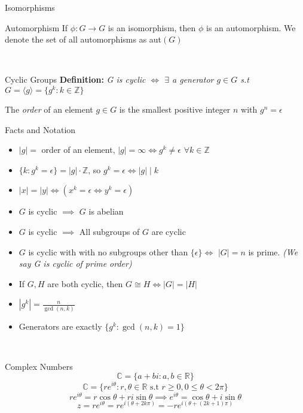 \documentclass{article}
\begin{document}
\begin{multicols*}{3}
\begin{blackbox}{Isomorphisms}
\begin{pinkbox}{Automorphism}
If $\phi: G \rightarrow G$ is an isomorphism, then $\phi$ is an automorphism. We denote the set of all automorphisms as aut$(G)$ 
\end{pinkbox}\\[-2ex]
\end{blackbox}
\begin{blackbox}{Cyclic Groups}
    \textbf{Definition:} \textit{G is cyclic $\iff$ $\exists$ a generator $g \in G$ s.t $G = \langle g \rangle = \{g^k: k \in \mathbb{Z}\}$}
    \raggedright
    The \emph{order} of an element $g \in G$ is the smallest positive integer $n$ with $g^n = \epsilon$\\[1.2ex]
    \begin{bluebox}{Facts and Notation}
        \begin{itemize}
        \item $|g| = $ order of an element, $|g| = \infty \iff g^k \neq \epsilon$ $\forall k \in \mathbb{Z}$
        \item $\{k: g^k = \epsilon\} = |g| \cdot \mathbb{Z}$, so $g^k = \epsilon \iff |g| \mid k$
        \item $|x| = |y| \iff (x^k = \epsilon \iff y^k = \epsilon)$ 
        \item $G$ is cyclic $\implies$ $G$ is abelian
        \item $G$ is cyclic $\implies$ All subgroups of $G$ are cyclic 
        \item $G$ is cyclic with with no subgroups other than $\{\epsilon\} \iff$ $|G| = n$ is prime. \textit{(We say G is cyclic of prime order)}
        \item If $G,H$ are both cyclic, then $G \cong H \iff |G| = |H|$
        \item $|g^k| = \frac{n}{\gcd(n,k)}$
        \item Generators are exactly $\{g^k: \gcd(n,k) = 1\}$
    \end{itemize}   
    \end{bluebox}\\[-2ex]
\end{blackbox}
\begin{blackbox}{Complex Numbers}
    \[ \mathbb{C} = \{a + bi: a,b \in \mathbb{R}\}\]
    \[ \mathbb{C} = \{re^{i\theta}: r,\theta\in \mathbb{R} \text{ s.t } r \geq 0, 0 \leq \theta < 2\pi\}\]
    \[re^{i\theta} = r\cos\theta + ri\sin\theta \implies e^{i\theta} = \cos\theta + i\sin\theta\]
    \[z = re^{i\theta} = re^{i(\theta + 2k\pi)} = -re^{i(\theta + (2k + 1)\pi)}\]

\end{blackbox}
\end{multicols*}
\end{document}
